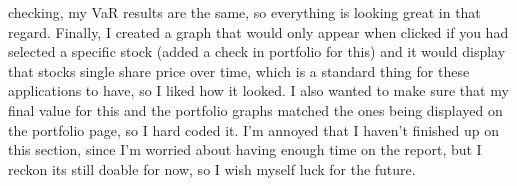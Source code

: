\documentclass{article}
\begin{document}
checking, my VaR results are the same, so everything is looking great in that regard. Finally, I created a graph that would only appear when clicked if you had selected a specific stock (added a check in portfolio for this) and it would display that stocks single share price over time, which is a standard thing for these applications to have, so I liked how it looked. I also wanted to make sure that my final value for this and the portfolio graphs matched the ones being displayed on the portfolio page, so I hard coded it. I'm annoyed that I haven't finished up on this section, since I'm worried about having enough time on the report, but I reckon its still doable for now, so I wish myself luck for the future.\\\vspace{0.3cm}
\end{document}
